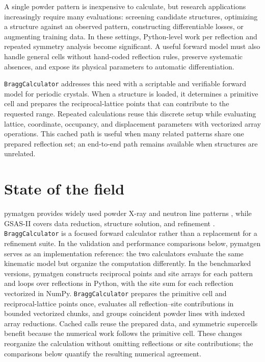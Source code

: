 \documentclass[10pt]{article}
\begin{document}
A single powder pattern is inexpensive to calculate, but research applications
increasingly require many evaluations: screening candidate structures,
optimizing a structure against an observed pattern, constructing differentiable
losses, or augmenting training data. In these settings, Python-level work per
reflection and repeated symmetry analysis become significant. A useful forward
model must also handle general cells without hand-coded reflection rules,
preserve systematic absences, and expose its physical parameters to automatic
differentiation.

\texttt{BraggCalculator} addresses this need with a scriptable and verifiable
forward model for periodic crystals. When a structure is loaded, it determines
a primitive cell and prepares the reciprocal-lattice points that can contribute
to the requested range. Repeated calculations reuse this discrete setup while
evaluating lattice, coordinate, occupancy, and displacement parameters with
vectorized array operations. This cached path is useful when many related
patterns share one prepared reflection set; an end-to-end path remains
available when structures are unrelated.

\section{State of the field}

pymatgen provides widely used powder X-ray and neutron line patterns
\citep{ong2013}, while GSAS-II covers data reduction, structure solution, and
refinement \citep{toby2013}. \texttt{BraggCalculator} is a focused forward
calculator rather than a replacement for a refinement suite. In the validation
and performance comparisons below, pymatgen serves as an implementation
reference: the two calculators evaluate the same kinematic model but organize
the computation differently. In the benchmarked versions, pymatgen constructs
reciprocal points and site arrays for each pattern and loops over reflections
in Python, with the site sum for each reflection vectorized in NumPy.
\texttt{BraggCalculator} prepares the primitive cell and reciprocal-lattice
points once, evaluates all reflection--site contributions in bounded vectorized
chunks, and groups coincident powder lines with indexed array reductions.
Cached calls reuse the prepared data, and symmetric supercells benefit because
the numerical work follows the primitive cell. These changes reorganize the
calculation without omitting reflections or site contributions; the comparisons
below quantify the resulting numerical agreement.
\end{document}
